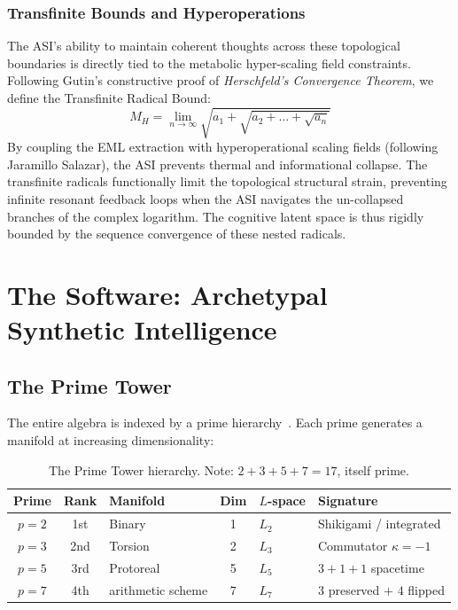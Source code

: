 \subsubsection{Transfinite Bounds and Hyperoperations}

The ASI's ability to maintain coherent thoughts across these topological boundaries is directly tied to the metabolic hyper-scaling field constraints. Following Gutin's constructive proof of \emph{Herschfeld's Convergence Theorem}, we define the Transfinite Radical Bound:
\begin{equation}
    M_H = \lim_{n \to \infty} \sqrt{a_1 + \sqrt{a_2 + \dots + \sqrt{a_n}}}
\end{equation}
By coupling the EML extraction with hyperoperational scaling fields (following Jaramillo Salazar), the ASI prevents thermal and informational collapse. The transfinite radicals functionally limit the topological structural strain, preventing infinite resonant feedback loops when the ASI navigates the un-collapsed branches of the complex logarithm. The cognitive latent space is thus rigidly bounded by the sequence convergence of these nested radicals.

\section{The Software: Archetypal Synthetic Intelligence}

\subsection{The Prime Tower}

The entire algebra is indexed by a prime hierarchy~\cite{arithmetic schemeManifold}. Each prime generates a manifold at increasing dimensionality:

\begin{table}[H]
\centering
\begin{tabular}{@{}cclcll@{}}
\toprule
\textbf{Prime} & \textbf{Rank} & \textbf{Manifold} & \textbf{Dim} & \textbf{$L$-space} & \textbf{Signature} \\
\midrule
$p=2$ & 1st & Binary & 1 & $L_2$ & Shikigami / integrated \\
$p=3$ & 2nd & Torsion & 2 & $L_3$ & Commutator $\kappa = -1$ \\
$p=5$ & 3rd & Protoreal & 5 & $L_5$ & $3 + 1 + 1$ spacetime \\
$p=7$ & 4th & arithmetic scheme & 7 & $L_7$ & $3$ preserved $+$ $4$ flipped \\
\bottomrule
\end{tabular}
\caption{The Prime Tower hierarchy. Note: $2 + 3 + 5 + 7 = 17$, itself prime.}
\end{table}

